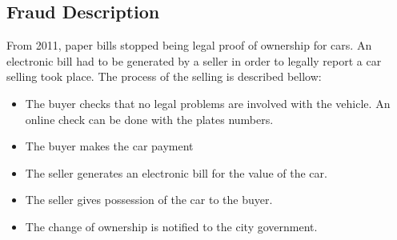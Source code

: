 \subsection{Fraud Description}
From 2011, paper bills stopped being legal proof of ownership for cars. An electronic bill had to be generated by a seller in order to legally report a car selling took place.
The process of the selling is described bellow:
\begin{itemize}
    \item The buyer checks that no legal problems are involved with the vehicle. An online check can be done with the plates numbers. 
    \item The buyer makes the car payment
    \item The seller generates an electronic bill for the value of the car.
    \item The seller gives possession of the car to the buyer.
    \item The change of ownership is notified to the city government.
\end{itemize}